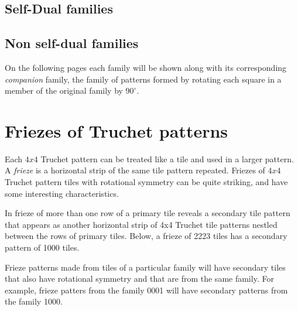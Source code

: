 \documentclass{tufte-book}
\begin{document}
\section{Self-Dual families}


\section{Non self-dual families}


On the following pages each family will be shown along with its corresponding \textit{companion} family, the family of patterns formed by rotating each square in a member of the original family by $90^{\circ}$. 

\newpage


% 
% 
\chapter{Friezes of Truchet patterns}

\noindent
Each $4x4$ Truchet pattern can be treated like a tile and used in a larger pattern. A \textit{frieze} is a horizontal strip of the same tile pattern repeated. Friezes of $4x4$ Truchet pattern tiles with rotational symmetry can be quite striking, and have some interesting characteristics. 

\vspace{0.5cm}
\noindent
In frieze of more than one row of a primary tile reveals a secondary tile pattern that appears as another horizontal strip of 4x4 Truchet tile patterns nestled between the rows of primary tiles. Below, a frieze of 2223 tiles has a secondary pattern of 1000 tiles.
\,

\vspace{0.5cm}


\vspace{0.5cm}
\noindent
Frieze patterns made from tiles of a particular family will have secondary tiles that also have rotational symmetry and that are from the same family. For example, frieze patters from the family 0001 will have secondary patterns from the family 1000. 
\marginnote{\centering} 
\end{document}
